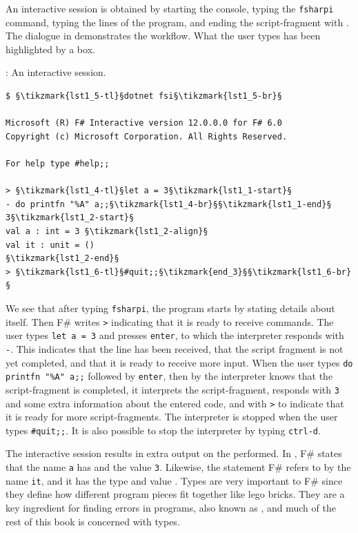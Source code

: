\documentclass[fsharpNotes.tex]{subfiles}
\begin{document}
An interactive session is obtained by starting the console, typing the \lstinline[language=console]{fsharpi} command, typing the lines of the program, and ending the script-fragment with \lexeme{;;}. The dialogue in  demonstrates the workflow. What the user types has been highlighted by a box.
%
\begin{codeNOutput}[label=interactiveSession,
  top=-5pt,
  bottom=-5pt,
  left=-2pt,
  right=-2pt,
]{: An interactive session.}
  \begin{lstlisting}[language=console,escapechar=§]
$ §\tikzmark{lst1_5-tl}§dotnet fsi§\tikzmark{lst1_5-br}§

Microsoft (R) F# Interactive version 12.0.0.0 for F# 6.0
Copyright (c) Microsoft Corporation. All Rights Reserved.

For help type #help;;

> §\tikzmark{lst1_4-tl}§let a = 3§\tikzmark{lst1_1-start}§
- do printfn "%A" a;;§\tikzmark{lst1_4-br}§§\tikzmark{lst1_1-end}§
3§\tikzmark{lst1_2-start}§
val a : int = 3 §\tikzmark{lst1_2-align}§
val it : unit = ()
§\tikzmark{lst1_2-end}§
> §\tikzmark{lst1_6-tl}§#quit;;§\tikzmark{end_3}§§\tikzmark{lst1_6-br}§
\end{lstlisting}%
%
%
%
\end{codeNOutput}%
%
We see that after typing \lstinline[language=console]{fsharpi}, the program starts by stating details about itself. Then F\# writes \lstinline{>} indicating that it is ready to receive commands. The user types \lstinline{let a = 3} and presses \lstinline[language=console]{enter}, to which the interpreter responds with \lstinline{-}. This indicates that the line has been received, that the script fragment is not yet completed, and that it is ready to receive more input. When the user types \lstinline{do printfn "%A" a;;} %
followed by \lstinline[language=console]{enter}, then by \lexeme{;;} the interpreter knows that the script-fragment is completed, it interprets the script-fragment, responds with \lstinline{3} and some extra information about the entered code, and with \lstinline{>} to indicate that it is ready for more script-fragments. The interpreter is stopped when the user types \lstinline[language=console]{#quit;;}. It is also possible to stop the interpreter by typing \lstinline[language=console]{ctrl-d}.

The interactive session results in extra output on the  performed. In , F\# states that the name \lstinline{a} has   and the value \lstinline{3}. Likewise, the  statement F\# refers to by the name \lstinline{it}, and it has the type  and value \lexeme{()}. Types are very important to F\# since they define how different program pieces fit together like lego bricks. They are a key ingredient for finding errors in programs, also known as , and much of the rest of this book is concerned with types.
\end{document}
